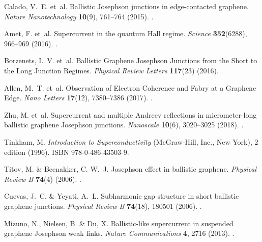 \documentclass[preprint,
  onecolumn,
  notitlepage,
  amsmath,amssymb,
  aip,
  apl,
]{revtex4-1}
\begin{document}
\begin{thebibliography}{10}
    Calado, V.~E. et~al.
    \newblock Ballistic {{Josephson}} junctions in edge-contacted graphene.
    \newblock \emph{Nature Nanotechnology} \textbf{10}(9), 761--764 (2015).
    \newblock {}.

    Amet, F. et~al.
    \newblock Supercurrent in the quantum {{Hall}} regime.
    \newblock \emph{Science} \textbf{352}(6288), 966--969 (2016).
    \newblock {}.

    Borzenets, I.~V. et~al.
    \newblock Ballistic {{Graphene Josephson Junctions}} from the {{Short}} to the
      {{Long Junction Regimes}}.
    \newblock \emph{Physical Review Letters} \textbf{117}(23) (2016).
    \newblock {}.

    Allen, M.~T. et~al.
    \newblock Observation of {{Electron Coherence}} and
      {{Fabry}} at a {{Graphene Edge}}.
    \newblock \emph{Nano Letters} \textbf{17}(12), 7380--7386 (2017).
    \newblock {}.

    Zhu, M. et~al.
    \newblock Supercurrent and multiple {{Andreev}} reflections in micrometer-long
      ballistic graphene {{Josephson}} junctions.
    \newblock \emph{Nanoscale} \textbf{10}(6), 3020--3025 (2018).
    \newblock {}.

    Tinkham, M.
    \newblock \emph{Introduction to {{Superconductivity}}} ({McGraw-Hill, Inc.},
      New York), 2 edition (1996).
    \newblock ISBN 978-0-486-43503-9.

    Titov, M. \& Beenakker, C. W.~J.
    \newblock Josephson effect in ballistic graphene.
    \newblock \emph{Physical Review B} \textbf{74}(4) (2006).
    \newblock {}.

    Cuevas, J.~C. \& Yeyati, A.~L.
    \newblock Subharmonic gap structure in short ballistic graphene junctions.
    \newblock \emph{Physical Review B} \textbf{74}(18), 180501 (2006).
    \newblock {}.

    Mizuno, N., Nielsen, B. \& Du, X.
    \newblock Ballistic-like supercurrent in suspended graphene {{Josephson}} weak
      links.
    \newblock \emph{Nature Communications} \textbf{4}, 2716 (2013).
    \newblock {}.


\end{thebibliography}
\end{document}
